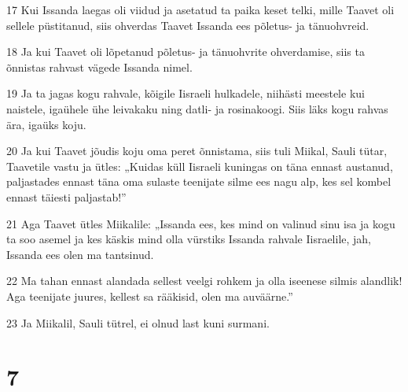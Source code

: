 \par 17 Kui Issanda laegas oli viidud ja asetatud ta paika keset telki, mille Taavet oli sellele püstitanud, siis ohverdas Taavet Issanda ees põletus- ja tänuohvreid.
\par 18 Ja kui Taavet oli lõpetanud põletus- ja tänuohvrite ohverdamise, siis ta õnnistas rahvast vägede Issanda nimel.
\par 19 Ja ta jagas kogu rahvale, kõigile Iisraeli hulkadele, niihästi meestele kui naistele, igaühele ühe leivakaku ning datli- ja rosinakoogi. Siis läks kogu rahvas ära, igaüks koju.
\par 20 Ja kui Taavet jõudis koju oma peret õnnistama, siis tuli Miikal, Sauli tütar, Taavetile vastu ja ütles: „Kuidas küll Iisraeli kuningas on täna ennast austanud, paljastades ennast täna oma sulaste teenijate silme ees nagu alp, kes sel kombel ennast täiesti paljastab!”
\par 21 Aga Taavet ütles Miikalile: „Issanda ees, kes mind on valinud sinu isa ja kogu ta soo asemel ja kes käskis mind olla vürstiks Issanda rahvale Iisraelile, jah, Issanda ees olen ma tantsinud.
\par 22 Ma tahan ennast alandada sellest veelgi rohkem ja olla iseenese silmis alandlik! Aga teenijate juures, kellest sa rääkisid, olen ma auväärne.”
\par 23 Ja Miikalil, Sauli tütrel, ei olnud last kuni surmani.

\chapter{7}

